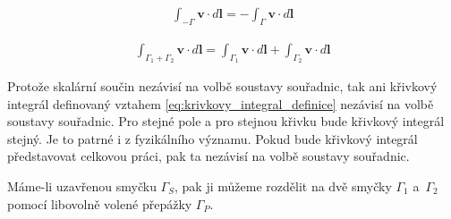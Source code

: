 \documentclass{book}
\newcommand{\vect}[1]{\boldsymbol{#1}}
\begin{document}
\begin{equation}
\label{eq:krivkovy_integral_opacny}
\begin{split}
\int_{-\Gamma} \vect{v} \cdot d\vect{l} = -\int_{\Gamma} \vect{v} \cdot d\vect{l}
\end{split}
\end{equation}

\begin{equation}
\label{eq:krivkovy_integral_soucet}
\begin{split}
\int_{\Gamma_1 + \Gamma_2} \vect{v} \cdot d\vect{l} = \int_{\Gamma_1} \vect{v} \cdot d\vect{l} + \int_{\Gamma_2} \vect{v} \cdot d\vect{l}
\end{split}
\end{equation}

Protože skalární součin nezávisí na volbě soustavy souřadnic, tak ani křivkový integrál definovaný vztahem \eqref{eq:krivkovy_integral_definice} nezávisí na volbě soustavy souřadnic. Pro stejné pole a pro stejnou křivku bude křivkový integrál stejný. Je to patrné i z fyzikálního významu. Pokud bude křivkový integrál představovat celkovou práci, pak ta nezávisí na volbě soustavy souřadnic.

Máme-li uzavřenou smyčku \(\Gamma_S\), pak ji můžeme rozdělit na dvě smyčky \(\Gamma_1\) a~\(\Gamma_2\) pomocí libovolně volené přepážky \(\Gamma_P\).

\end{document}

